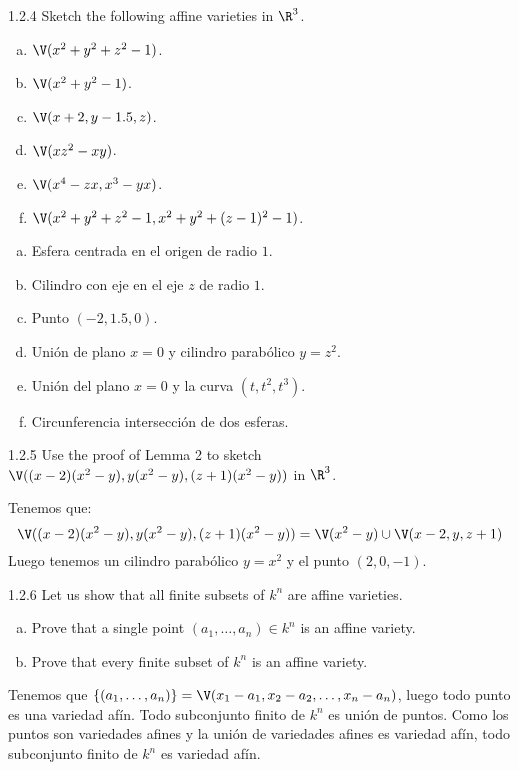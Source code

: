 \documentclass[twoside]{article}
\begin{document}
\newpage

\begin{ejercicio}{1.2.4}
Sketch the following affine varieties in $\R^3$.
\begin{enumerate}[a.]
\item $\V(x^2+y^2+z^2-1)$.
\item $\V(x^2+y^2-1)$.
\item $\V(x+2,y-1.5,z)$.
\item $\V(xz^2-xy)$.
\item $\V(x^4-zx,x^3-yx)$.
\item $\V(x^2+y^2+z^2-1, x^2+y^2+(z-1)^2-1)$.
\end{enumerate}
\end{ejercicio}
\begin{solucion}
\begin{enumerate}[a.]
\item Esfera centrada en el origen de radio $1$.
\item Cilindro con eje en el eje $z$ de radio $1$.
\item Punto $(-2,1.5,0)$.
\item Unión de plano $x=0$ y cilindro parabólico $y=z^2$.
\item Unión del plano $x=0$ y la curva $(t,t^2,t^3)$.
\item Circunferencia intersección de dos esferas.
\end{enumerate}
\end{solucion}

\newpage


\begin{ejercicio}{1.2.5}
Use the proof of Lemma 2 to sketch $\V((x-2)(x^2-y),y(x^2-y),(z+1)(x^2-y))$ in $\R^3$.
\end{ejercicio}
\begin{solucion}
Tenemos que:
\[ \V((x-2)(x^2-y),y(x^2-y),(z+1)(x^2-y)) = \V(x^2-y) \cup \V(x-2,y,z+1) \]
Luego tenemos un cilindro parabólico $y=x^2$ y el punto $(2,0,-1)$.
\end{solucion}

\newpage

\begin{ejercicio}{1.2.6}
Let us show that all finite subsets of $k^n$ are affine varieties.
\begin{enumerate}[a.]
\item Prove that a single point $(a_1,\dots,a_n) \in k^n$ is an affine variety.
\item Prove that every finite subset of $k^n$ is an affine variety.
\end{enumerate}
\end{ejercicio}
\begin{solucion}
Tenemos que $\{(a_1,\dots,a_n)\} = \V(x_1-a_1,x_2-a_2,\dots,x_n-a_n)$, luego todo punto es una variedad afín.
Todo subconjunto finito de $k^n$ es unión de puntos.
Como los puntos son variedades afines y la unión de variedades afines es variedad afín, todo subconjunto finito de $k^n$ es variedad afín.
\end{solucion}
\end{document}
